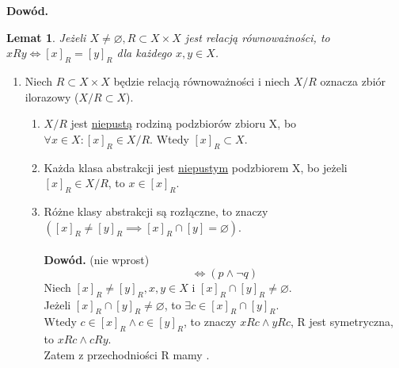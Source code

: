 \documentclass[a5paper,8pt]{article}
\theoremstyle{mythmstyle}
\newtheorem{lemat}{Lemat}[section]
\begin{document}
            \textbf{Dowód.}
            \begin{lemat}
                Jeżeli $ X \neq \varnothing, R \subset X \times X $ jest relacją równoważności,
                to $ x R y \iff [x]_R = [y]_R $ dla każdego $x, y \in X$.
            \end{lemat}

            \begin{enumerate}
                \item Niech $ R \subset X \times X $ będzie relacją równoważności i niech $ X / R $
                oznacza zbiór ilorazowy ($ X / R \subset X $).
                    \begin{enumerate}
                        \item $ X / R $ jest \underline{niepustą} rodziną podzbiorów zbioru X,
                        bo $ \forall x \in X : [x]_R \in X / R $. Wtedy $ [x]_R \subset X $.

                        \item Każda klasa abstrakcji jest \underline{niepustym} podzbiorem X,
                        bo jeżeli $[x]_R \in X / R $, to $ x \in [x]_R $.

                        \item Różne klasy abstrakcji są rozłączne, to znaczy\\ $( [x]_R \neq [y]_R
                        \implies [x]_R \cap [y] = \varnothing)$.\\\\
                        \textbf{Dowód.} (nie wprost)\\
                        \begin{equation*}
                            [\neg (p \implies q)] \iff (p \wedge \neg q)
                        \end{equation*}
                        Niech $ [x]_R \neq [y]_R, x, y \in X $ i \underline{$ [x]_R \cap [y]_R \neq \varnothing $}.\\
                        Jeżeli $ [x]_R \cap [y]_R \neq \varnothing $, to $ \exists c \in [x]_R \cap [y]_R $.\\
                        Wtedy $ c \in [x]_R \wedge c \in [y]_R $, to znaczy $ x R c \wedge y R c $,
                        R jest symetryczna, to \underline{$ x R c \wedge c R y $}. \\
                        Zatem z przechodniości R mamy .\\


\end{enumerate}
\end{enumerate}
\end{document}
